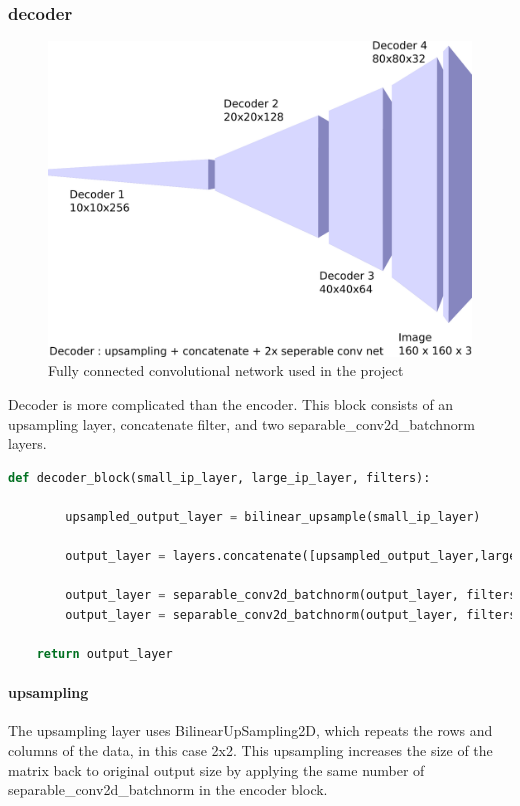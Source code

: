 \documentclass[paper=a4, fontsize=11pt]{scrartcl} %
\numberwithin{equation}{section} %
\numberwithin{figure}{section} %
\numberwithin{table}{section} %
\begin{document}
\subsubsection{decoder}\label{rubric12}
\begin{figure}[htp]
	\centering
	\includegraphics[scale=0.2]{./imgs/decoder.png}
	\caption{Fully connected convolutional network used in the project}
	\label{fig:decoder}
\end{figure}

Decoder is more complicated than the encoder. This block consists of an upsampling layer, concatenate filter, and two separable\_conv2d\_batchnorm layers.
\begin{lstlisting}[language=Python, caption=Decoder block code]
	def decoder_block(small_ip_layer, large_ip_layer, filters):
    
		upsampled_output_layer = bilinear_upsample(small_ip_layer)
		
		output_layer = layers.concatenate([upsampled_output_layer,large_ip_layer])
		
		output_layer = separable_conv2d_batchnorm(output_layer, filters)
		output_layer = separable_conv2d_batchnorm(output_layer, filters)
    
    return output_layer
\end{lstlisting}

\paragraph{upsampling} The upsampling layer uses BilinearUpSampling2D, which repeats the rows and columns of the data, in this case 2x2. This upsampling increases the size of the matrix back to original output size by applying the same number of separable\_conv2d\_batchnorm in the encoder block.
\end{document}
